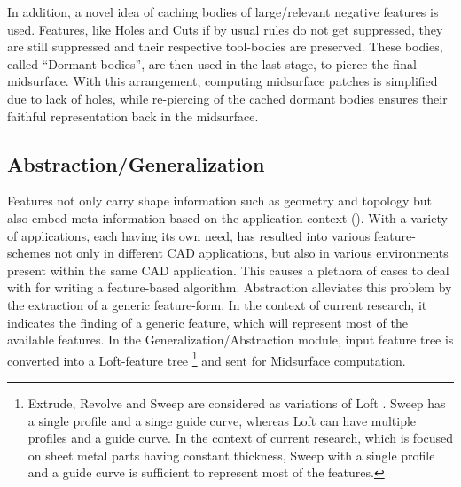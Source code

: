 
In addition, a novel idea of caching bodies of large/relevant negative features is used.  Features, like Holes and Cuts if by usual rules do not get suppressed, they are still suppressed and their respective tool-bodies are preserved. These bodies, called ``Dormant bodies'', are then used in the last stage, to pierce the final midsurface. With this arrangement, computing midsurface patches is simplified due to lack of holes, while re-piercing of the cached dormant bodies ensures their faithful representation back in the midsurface.

\subsection{Abstraction/Generalization}\label{sec:abstraction}
Features not only carry shape information such as geometry and topology but also embed meta-information based on the application context (\cite{Shah1995}). With a variety of applications, each having its own need,  has resulted into various feature-schemes not only in different CAD applications, but also in various environments present within the same CAD application.  This causes a plethora of cases to deal with for writing a feature-based algorithm. Abstraction alleviates this problem by the extraction of a generic feature-form.  In the context of current research, it indicates the  finding of a generic feature, which will represent most of the available features. In the Generalization/Abstraction module, input feature tree is converted into a Loft-feature tree \footnote{Extrude, Revolve and Sweep are considered as variations of Loft \cite{YogeshIITG2014}. Sweep has a single profile and a singe guide curve, whereas Loft can have multiple profiles and a guide curve. In the context of current research, which is focused on sheet metal parts having constant thickness, Sweep with a single profile and a guide curve is sufficient to represent most of the features.} and sent for Midsurface computation. 

